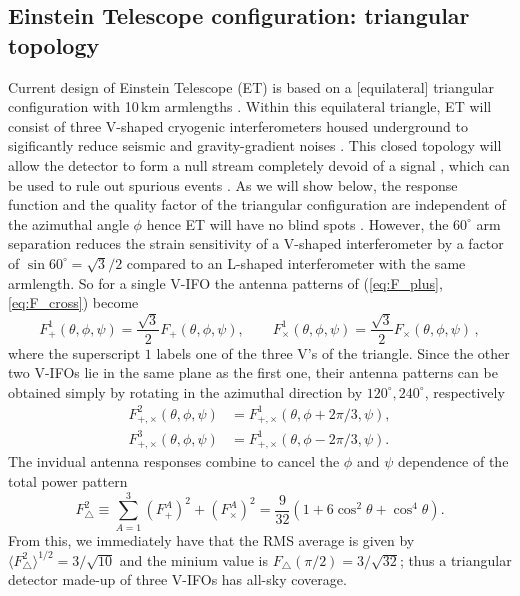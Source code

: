 \documentclass[prd,amsmath,amssymb,aps,floats,amsfonts,notitlepage,superscriptaddress,eqsecnum,nofootinbib,10pt]{revtex4-1}
\newcommand{\f}{\frac}
\newcommand{\be}{\begin{equation}}
\newcommand{\ee}{\end{equation}}
\begin{document}
\subsection{Einstein Telescope configuration: triangular topology}\label{sec:ET_topo}
Current design of Einstein Telescope (ET) is based on a [equilateral] triangular configuration with 10\,km armlengths \cite{ET_doc}.
Within this equilateral triangle, ET will consist of three V-shaped cryogenic interferometers housed underground to
sigificantly reduce seismic and gravity-gradient noises \cite{ET_doc}.
This closed topology will allow the detector to form a null stream completely devoid of a signal \cite{Sathyaprakash:2012jk},
which can be used to rule out spurious events \cite{Wen:2005ui}.
As we will show below, the response function and the quality factor of the triangular configuration are independent of the azimuthal angle $\phi$
hence ET will have no blind spots \cite{Regimbau:2012ir}.
However, the $60^\circ$ arm separation reduces the strain sensitivity of a V-shaped interferometer by a factor of $\sin 60^\circ=\sqrt{3}/2$ compared
to an L-shaped interferometer with the same armlength. So for a single V-IFO the antenna patterns of (\ref{eq:F_plus}, \ref{eq:F_cross}) become
%
\be
F^1_+(\theta,\phi,\psi)= \f{\sqrt{3}}{2} F_+(\theta,\phi,\psi), \qquad F^1_\times(\theta,\phi,\psi)= \f{\sqrt{3}}{2} F_\times(\theta,\phi,\psi)\label{eq:F1plus_F1cross}\, ,
\ee
%
where the superscript $1$ labels one of the three V's of the triangle.
Since the other two V-IFOs lie in the same plane as the first one, their antenna patterns can be obtained simply by rotating in the azimuthal
direction by $120^\circ, 240^\circ$, respectively
%
\begin{align}
 F^2_{+,\times}(\theta,\phi,\psi) &= F^1_{+,\times}(\theta,\phi+2\pi/3,\psi), \label{eq:F2plus_F2cross}\\
 F^3_{+,\times}(\theta,\phi,\psi) &= F^1_{+,\times}(\theta,\phi-2\pi/3,\psi) \label{eq:F3plus_F3cross}.
\end{align}
%
The invidual antenna responses combine to cancel the $\phi$ and $\psi$ dependence of the total power pattern
%
\be
F^2_\bigtriangleup \equiv \sum_{A=1}^3 \left(F^A_+\right)^2+\left(F^A_\times\right)^2 = \f{9}{32}\left(1+6\cos^2\theta + \cos^4\theta\right). \label{eq:ET_power_pattern}
\ee
%
From this, we immediately have that the RMS average is given by $\langle F^2_\bigtriangleup\rangle^{1/2} =3/\sqrt{10}$ and the minium value is $F_\bigtriangleup(\pi/2)=3/\sqrt{32}$;
thus a triangular detector made-up of three V-IFOs has all-sky coverage.
\end{document}
